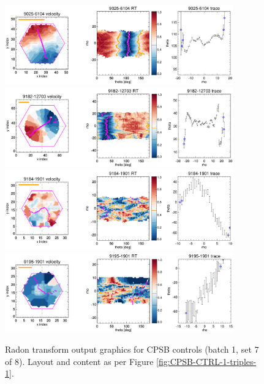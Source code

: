 \documentclass[fleqn,usenatbib]{mnras}
\begin{document}
\begin{figure}
    \centering
    \includegraphics[width=0.88\textwidth]{Images/SN1-MC250/CPSB-CTRL-1-triples/9025-6104-1-250-10.png}
    \includegraphics[width=0.88\textwidth]{Images/SN1-MC250/CPSB-CTRL-1-triples/9182-12703-1-250-10.png}
    \includegraphics[width=0.88\textwidth]{Images/SN1-MC250/CPSB-CTRL-1-triples/9184-1901-1-250-10.png}
    \includegraphics[width=0.88\textwidth]{Images/SN1-MC250/CPSB-CTRL-1-triples/9195-1901-1-250-10.png}
    \caption{Radon transform output graphics for CPSB controls (batch 1, set 7 of 8). Layout and content as per Figure \ref{fig:CPSB-CTRL-1-triples-1}.}
    \label{fig:CPSB-CTRL-1-triples-7}
\end{figure}
\end{document}
